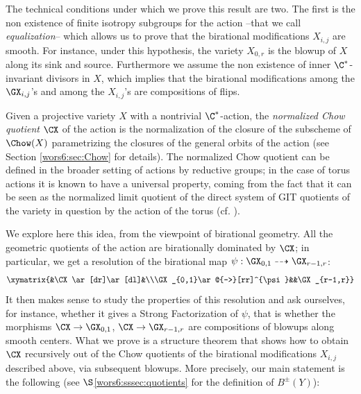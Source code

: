 \documentclass[reqno]{amsproc}
\theoremstyle{definition}
\begin{document}
The technical conditions under which we prove this result are two. The first is the non existence of finite isotropy subgroups for the action  --that we call {\em equalization}-- which allows us to prove that the birational modifications $X_{i,j}$ are smooth. For instance, under this hypothesis, the variety $X_{0,r}$ is the blowup of $X$ along its sink and source.  Furthermore we assume the non existence of inner $\C^*$-invariant divisors in $X$, which implies that the birational modifications among the $\GX_{i,j}$'s and among the $X_{i,j}$'s are compositions of flips. 

Given a projective variety $X$  with a nontrivial $\C^*$-action, the  {\em normalized Chow quotient}  $\CX$ of the action is  the normalization of the closure of the subscheme of $\Chow(X)$ parametrizing the closures of the general orbits of the action (see Section \ref{wors6:sec:Chow} for details). The normalized Chow quotient can be defined in the broader setting of actions by reductive groups; in the case of torus actions it is known to have a universal property, coming from the fact that it can be seen as the normalized limit quotient of the direct system of GIT quotients of the variety in question by the action of the torus (cf. \cite[Corollary 2.6]{wors6-BHK}).

We explore here this idea, from the viewpoint of birational geometry. All the geometric quotients of the action are birationally dominated by $\CX$; in particular, we get a resolution  of the birational map $\psi:\GX_{0,1}\dashrightarrow \GX_{r-1,r}$:
$$
\xymatrix{&\CX\ar[dr]\ar[dl]&\\\GX_{0,1}\ar@{-->}[rr]^{\psi}&&\GX_{r-1,r}}
$$
It then makes sense to study the properties of this resolution and ask ourselves, for instance, whether it gives a Strong Factorization of $\psi$, that is whether the morphisms $\CX\to \GX_{0,1}$, $\CX\to \GX_{r-1,r}$ are compositions of blowups along smooth centers. What we prove is a structure theorem that shows how to obtain $\CX$ recursively out of the Chow quotients of the birational modifications $X_{i,j}$ described above, via subsequent blowups. More precisely, our main statement is the following (see $\S$\ref{wors6:sssec:quotients} for the definition of $B^\pm(Y)$):
\end{document}
